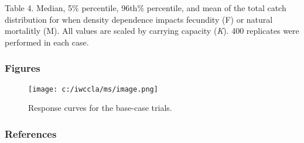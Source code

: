 \documentclass[]{article}
\begin{document}
Table 4. Median, 5\% percentile, 96th\% percentile, and mean of the total
catch distribution for when density dependence impacts fecundity (F)
or natural mortalitly (M). All values are scaled by carrying capacity (\emph{K}).
400 replicates were performed in each case.


% 

\subsubsection{Figures}\label{figures}

\begin{figure}[htbp]
\centering
\texttt{[image: c:/iwccla/ms/image.png]}
\caption{Response curves for the base-case trials.}
\label{fig:respcurv_base}
\end{figure}

\subsubsection{References}\label{references}
% 
%     
\end{document}
